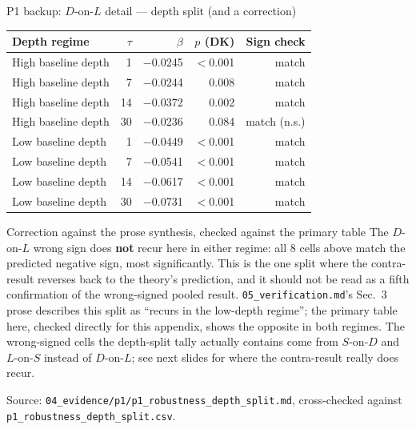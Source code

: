 \documentclass[aspectratio=169]{beamer}
\begin{document}
\begin{frame}{P1 backup: $D$-on-$L$ detail --- depth split (and a correction)}
  \scriptsize
  \begin{center}
  \begin{tabular}{@{}l r r r r@{}}
    \toprule
    Depth regime & $\tau$ & $\beta$ & $p$ (DK) & Sign check \\
    \midrule
    High baseline depth & 1  & $-$0.0245 & $<$0.001 & match \\
    High baseline depth & 7  & $-$0.0244 & 0.008 & match \\
    High baseline depth & 14 & $-$0.0372 & 0.002 & match \\
    High baseline depth & 30 & $-$0.0236 & 0.084 & match (n.s.) \\
    Low baseline depth  & 1  & $-$0.0449 & $<$0.001 & match \\
    Low baseline depth  & 7  & $-$0.0541 & $<$0.001 & match \\
    Low baseline depth  & 14 & $-$0.0617 & $<$0.001 & match \\
    Low baseline depth  & 30 & $-$0.0731 & $<$0.001 & match \\
    \bottomrule
  \end{tabular}
  \end{center}
  \vspace{0.1em}
  \begin{alertblock}{Correction against the prose synthesis, checked against the primary table}
    \scriptsize The $D$-on-$L$ wrong sign does \textbf{not} recur here in either regime: all 8 cells above match the predicted negative sign, most significantly. This is the one split where the contra-result reverses back to the theory's prediction, and it should not be read as a fifth confirmation of the wrong-signed pooled result. \texttt{05\_verification.md}'s Sec.\ 3 prose describes this split as ``recurs in the low-depth regime''; the primary table here, checked directly for this appendix, shows the opposite in both regimes. The wrong-signed cells the depth-split tally actually contains come from $S$-on-$D$ and $L$-on-$S$ instead of $D$-on-$L$; see next slides for where the contra-result really does recur.
  \end{alertblock}
  \vspace{-0.3em}
  {\scriptsize Source: \texttt{04\_evidence/p1/p1\_robustness\_depth\_split.md}, cross-checked against \texttt{p1\_robustness\_depth\_split.csv}.}
\end{frame}
\end{document}
